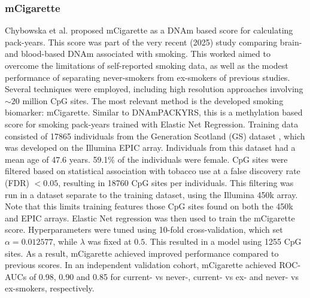 \documentclass[draft]{article} %
\begin{document}
\subsubsection{mCigarette} \label{sec:mcigarette}
Chybowska et al. \cite{chybowska2025blood} proposed mCigarette as a DNAm based score for calculating pack-years. This score was part of the very recent (2025) study comparing brain- and blood-based DNAm associated with smoking. This worked aimed to overcome the limitations of self-reported smoking data, as well as the modest performance of separating never-smokers from ex-smokers of previous studies. Several techniques were employed, including high resolution approaches involving \(\sim \! 20\) million CpG sites. The most relevant method is the developed smoking biomarker: mCigarette. Similar to DNAmPACKYRS, this is a methylation based score for smoking pack-years trained with Elastic Net Regression. Training data consisted of \num{17865} individuals from the Generation Scotland (GS) dataset \cite{smith2006generation}, which was developed on the Illumina EPIC array. Individuals from this dataset had a mean age of 47.6 years. 59.1\% of the individuals were female. CpG sites were filtered based on statistical association with tobacco use at a false discovery rate (FDR) \(< 0.05\), resulting in \num{18760} CpG sites per individuals. This filtering was run in a dataset separate to the training dataset, using the Illumina 450k array. Note that this limits training features those CpG sites found on both the 450k and EPIC arrays. Elastic Net regression was then used to train the mCigarette score. Hyperparameters were tuned using 10-fold cross-validation, which set \(\alpha = 0.012577\), while \(\lambda\) was fixed at \(0.5\). This resulted in a model using \num{1255} CpG sites. As a result, mCigarette achieved improved performance compared to previous scores. In an independent validation cohort, mCigarette achieved ROC-AUCs of 0.98, 0.90 and 0.85 for current- vs never-, current- vs ex- and never- vs ex-smokers, respectively.

\end{document}
